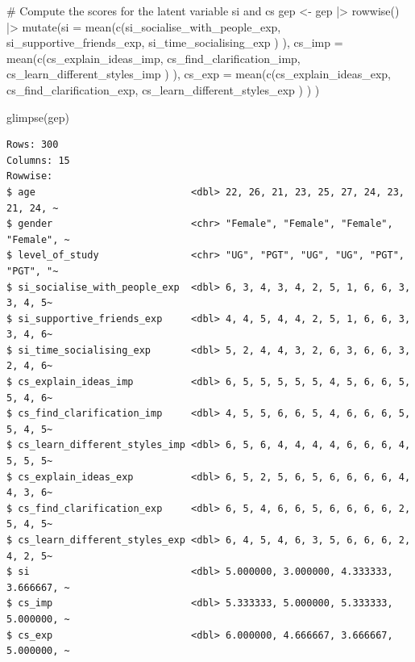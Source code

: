 \documentclass[
  letterpaper,
]{krantz}
\makeatletter
\newenvironment{Shaded}{\begin{snugshade}}{\end{snugshade}}
\newcommand{\AttributeTok}[1]{\textcolor[rgb]{0.40,0.45,0.13}{#1}}
\newcommand{\CommentTok}[1]{\textcolor[rgb]{0.37,0.37,0.37}{#1}}
\newcommand{\FunctionTok}[1]{\textcolor[rgb]{0.28,0.35,0.67}{#1}}
\newcommand{\NormalTok}[1]{\textcolor[rgb]{0.00,0.23,0.31}{#1}}
\newcommand{\OtherTok}[1]{\textcolor[rgb]{0.00,0.23,0.31}{#1}}
\newcommand{\SpecialCharTok}[1]{\textcolor[rgb]{0.37,0.37,0.37}{#1}}
\newenvironment{kframe}{%
\medskip{}
\setlength{\fboxsep}{.8em}
 \def\at@end@of@kframe{}%
 \ifinner\ifhmode%
  \def\at@end@of@kframe{\end{minipage}}%
  \begin{minipage}{\columnwidth}%
 \fi\fi%
 \def\FrameCommand##1{\hskip\@totalleftmargin \hskip-\fboxsep
 \colorbox{shadecolor}{##1}\hskip-\fboxsep
     \hskip-\linewidth \hskip-\@totalleftmargin \hskip\columnwidth}%
 \MakeFramed {\advance\hsize-\width
   \@totalleftmargin\z@ \linewidth\hsize
   \@setminipage}}%
 {\par\unskip\endMakeFramed%
 \at@end@of@kframe}
\renewenvironment{Shaded}{\begin{kframe}}{\end{kframe}}
\makeatother
\begin{document}
\begin{Shaded}
\begin{Highlighting}[]
\CommentTok{\# Compute the scores for the latent variable \textquotesingle{}si\textquotesingle{} and \textquotesingle{}cs\textquotesingle{}}
\NormalTok{gep }\OtherTok{\textless{}{-}}
\NormalTok{  gep }\SpecialCharTok{|\textgreater{}}
  \FunctionTok{rowwise}\NormalTok{() }\SpecialCharTok{|\textgreater{}}
  \FunctionTok{mutate}\NormalTok{(}\AttributeTok{si =} \FunctionTok{mean}\NormalTok{(}\FunctionTok{c}\NormalTok{(si\_socialise\_with\_people\_exp,}
\NormalTok{                     si\_supportive\_friends\_exp,}
\NormalTok{                     si\_time\_socialising\_exp}
\NormalTok{                     )}
\NormalTok{                   ),}
         \AttributeTok{cs\_imp =} \FunctionTok{mean}\NormalTok{(}\FunctionTok{c}\NormalTok{(cs\_explain\_ideas\_imp,}
\NormalTok{                         cs\_find\_clarification\_imp,}
\NormalTok{                         cs\_learn\_different\_styles\_imp}
\NormalTok{                         )}
\NormalTok{                       ),}
         \AttributeTok{cs\_exp =} \FunctionTok{mean}\NormalTok{(}\FunctionTok{c}\NormalTok{(cs\_explain\_ideas\_exp,}
\NormalTok{                         cs\_find\_clarification\_exp,}
\NormalTok{                         cs\_learn\_different\_styles\_exp}
\NormalTok{                         )}
\NormalTok{                       )}
\NormalTok{         )}

\FunctionTok{glimpse}\NormalTok{(gep)}
\end{Highlighting}
\end{Shaded}

\begin{verbatim}
Rows: 300
Columns: 15
Rowwise: 
$ age                           <dbl> 22, 26, 21, 23, 25, 27, 24, 23, 21, 24, ~
$ gender                        <chr> "Female", "Female", "Female", "Female", ~
$ level_of_study                <chr> "UG", "PGT", "UG", "UG", "PGT", "PGT", "~
$ si_socialise_with_people_exp  <dbl> 6, 3, 4, 3, 4, 2, 5, 1, 6, 6, 3, 3, 4, 5~
$ si_supportive_friends_exp     <dbl> 4, 4, 5, 4, 4, 2, 5, 1, 6, 6, 3, 3, 4, 6~
$ si_time_socialising_exp       <dbl> 5, 2, 4, 4, 3, 2, 6, 3, 6, 6, 3, 2, 4, 6~
$ cs_explain_ideas_imp          <dbl> 6, 5, 5, 5, 5, 5, 4, 5, 6, 6, 5, 5, 4, 6~
$ cs_find_clarification_imp     <dbl> 4, 5, 5, 6, 6, 5, 4, 6, 6, 6, 5, 5, 4, 5~
$ cs_learn_different_styles_imp <dbl> 6, 5, 6, 4, 4, 4, 4, 6, 6, 6, 4, 5, 5, 5~
$ cs_explain_ideas_exp          <dbl> 6, 5, 2, 5, 6, 5, 6, 6, 6, 6, 4, 4, 3, 6~
$ cs_find_clarification_exp     <dbl> 6, 5, 4, 6, 6, 5, 6, 6, 6, 6, 2, 5, 4, 5~
$ cs_learn_different_styles_exp <dbl> 6, 4, 5, 4, 6, 3, 5, 6, 6, 6, 2, 4, 2, 5~
$ si                            <dbl> 5.000000, 3.000000, 4.333333, 3.666667, ~
$ cs_imp                        <dbl> 5.333333, 5.000000, 5.333333, 5.000000, ~
$ cs_exp                        <dbl> 6.000000, 4.666667, 3.666667, 5.000000, ~
\end{verbatim}
\end{document}
